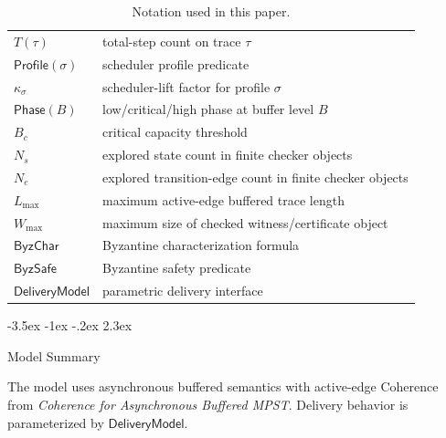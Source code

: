 \documentclass[a4paper,10pt,twocolumn,english]{article}
\makeatletter
\renewcommand{\section}{\@startsection{section}{1}{\z@}%
  {-3.5ex \@plus -1ex \@minus -.2ex}%
  {2.3ex}%
  {\raggedright\normalfont\large\bfseries}}
\numberwithin{equation}{section}
\theoremstyle{paperdef}
\theoremstyle{paperplain}
\theoremstyle{paperdef}
\theoremstyle{paperremark}
\newcommand{\DeliveryModel}{\ensuremath{\mathsf{DeliveryModel}}}
\newcommand{\ByzSafe}{\ensuremath{\mathsf{ByzSafe}}}
\newcommand{\ByzChar}{\ensuremath{\mathsf{ByzChar}}}
\newcommand{\Bc}{\ensuremath{B_c}}
\newcommand{\Profile}{\ensuremath{\mathsf{Profile}}}
\newcommand{\Phase}{\ensuremath{\mathsf{Phase}}}
\makeatother
\begin{document}
\begin{table}[H]
\begin{tabularx}{\columnwidth}{@{}L{0.33\columnwidth}L{0.62\columnwidth}@{}}
		$T(\tau)$            & total-step count on trace $\tau$                                                               \\
		$\Profile(\sigma)$   & scheduler profile predicate                                                                    \\
		$\kappa_\sigma$      & scheduler-lift factor for profile $\sigma$                                                     \\
		$\Phase(B)$          & low/critical/high phase at buffer level $B$                                                    \\
		$\Bc$                & critical capacity threshold                                                                    \\
		$N_s$                & explored state count in finite checker objects                                                 \\
		$N_e$                & explored transition-edge count in finite checker objects                                       \\
		$L_{\max}$           & maximum active-edge buffered trace length                                                      \\
		$W_{\max}$           & maximum size of checked witness/certificate object                                             \\
		\ByzChar             & Byzantine characterization formula                                                             \\
		\ByzSafe             & Byzantine safety predicate                                                                     \\
		\DeliveryModel       & parametric delivery interface                                                                  \\
		\bottomrule
	\end{tabularx}
	\caption{Notation used in this paper.}
	\label{tab:p2-notation}
\end{table}

\section{Model Summary}
\label{sec:model}

The model uses asynchronous buffered semantics with active-edge Coherence from \emph{Coherence for Asynchronous Buffered MPST}. Delivery behavior is parameterized by \DeliveryModel.
\end{document}
